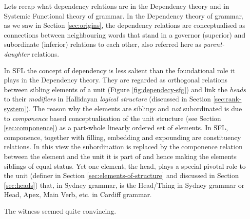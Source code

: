 
Lets recap what dependency relations are in the Dependency theory and in Systemic Functional theory of grammar. In the Dependency theory of grammar, as we saw in Section \ref{sec:origins}, the dependency relations are conceptualised as connections between neighbouring words that stand in a governor (superior) and subordinate (inferior) relations to each other, also referred here as \textit{parent-daughter} relations. 

In SFL the concept of dependency is less salient than the foundational role it plays in the Dependency theory. They are regarded as orthogonal relations between sibling elements of a unit (Figure \ref{fig:dependecy-sfg}) and link the \textit{heads} to their \textit{modifiers} in Hallidayan \textit{logical structure}\citep[388]{Halliday2013} (discussed in Section \ref{sec:rank-system}). The reason why the elements are siblings and \textit{not} subordinated is due to \textit{componence} based conceptualisation of the unit structure (see Section \ref{sec:componence}) as a part-whole linearly ordered set of elements. In SFL, componence, together with filling, embedding and expounding are constituency relations. In this view the subordination is replaced by the componence relation between the element and the unit it is part of and hence making the elements siblings of equal status. Yet one element, the head, plays a special pivotal role to the unit (definer in Section \ref{sec:elements-of-structure} and discussed in Section \ref{sec:heads}) that, in Sydney grammar, is the Head/Thing in Sydney grammar or Head, Apex, Main Verb, etc. in Cardiff grammar.


\begin{exe}
    \ex\label{ex:witness} The witness seemed quite convincing. 
\end{exe}

